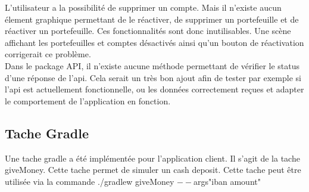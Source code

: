 \documentclass[../rapport.tex]{subfiles}
\begin{document}
L'utilisateur a la possibilité de supprimer un compte. Mais il n'existe aucun élement graphique permettant de le réactiver, de supprimer un portefeuille et de réactiver un portefeuille. Ces fonctionnalités sont donc inutilisables. Une scène affichant les portefeuilles et comptes désactivés ainsi qu'un bouton de réactivation corrigerait ce problème.\\
Dans le package API, il n'existe aucune méthode permettant de vérifier le status d'une réponse de l'api. Cela serait un très bon ajout afin de tester par exemple si l'api est actuellement fonctionnelle, ou les données correctement reçues et adapter le comportement de l'application en fonction. 

\subsection{Tache Gradle}
Une tache gradle a été implémentée pour l'application client. Il s'agit de la tache giveMoney. Cette tache permet de simuler un cash deposit. Cette tache peut être utilisée via la commande ./gradlew giveMoney $--$args"iban amount"

\newpage
\end{document}
